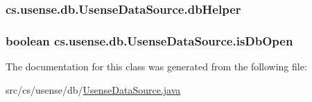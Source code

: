 \subsubsection[{db\+Helper}]{ cs.\+usense.\+db.\+Usense\+Data\+Source.\+db\+Helper\hspace{0.3cm}{\ttfamily [private]}}\label{classcs_1_1usense_1_1db_1_1_usense_data_source_aa008324e180fdd3b8a05df5592323953}
\hypertarget{classcs_1_1usense_1_1db_1_1_usense_data_source_a2f2c3e38590dacfb49c2d184ff6bd996}{}
\subsubsection[{is\+Db\+Open}]{\setlength{\rightskip}{0pt plus 5cm}boolean cs.\+usense.\+db.\+Usense\+Data\+Source.\+is\+Db\+Open\hspace{0.3cm}{\ttfamily [private]}}\label{classcs_1_1usense_1_1db_1_1_usense_data_source_a2f2c3e38590dacfb49c2d184ff6bd996}


The documentation for this class was generated from the following file\+:\begin{DoxyCompactItemize}
\item 
src/cs/usense/db/\hyperlink{_usense_data_source_8java}{Usense\+Data\+Source.\+java}\end{DoxyCompactItemize}
